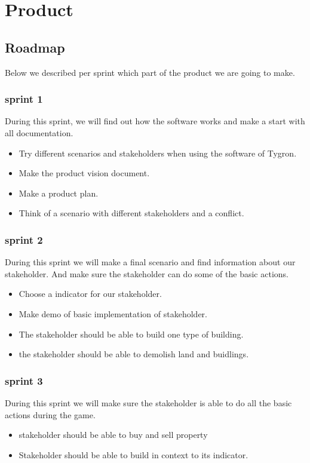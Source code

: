 \label{product}
\section{Product}

\subsection{Roadmap}
Below we described per sprint which part of the product we are going to make. \newline

\subsubsection{sprint 1}
During this sprint, we will find out how the software works and make a start with all documentation.
\begin{itemize}
	\item Try different scenarios and stakeholders when using the software of Tygron.
	\item Make the product vision document.
	\item Make a product plan.
	\item Think of a scenario with different stakeholders and a conflict.
\end{itemize}


\subsubsection{sprint 2}
During this sprint we will make a final scenario and find information about our stakeholder. And make sure the stakeholder can do some of the basic actions.
\begin{itemize}
	\item Choose a indicator for our stakeholder.
	\item Make demo of basic implementation of stakeholder.
	\item The stakeholder should be able to build one type of building.
	\item the stakeholder should be able to demolish land and buidlings.
\end{itemize}



\subsubsection{sprint 3}
During this sprint we will make sure the stakeholder is able to do all the basic actions during the game.
\begin{itemize}
	\item stakeholder should be able to buy and sell property
	\item Stakeholder should be able to build in context to its indicator.
\end{itemize}


